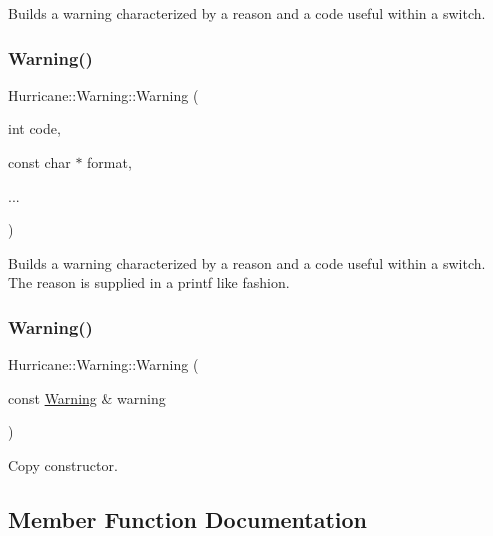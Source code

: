 Builds a warning characterized by a reason and a code useful within a switch. \mbox{\label{classHurricane_1_1Warning_aad9cf84a9c08fb2012462e6f38450bf0}} 
\subsubsection{\texorpdfstring{Warning()}{Warning()}\hspace{0.1cm}{\footnotesize\ttfamily [4/5]}}
{\footnotesize\ttfamily Hurricane\+::\+Warning\+::\+Warning (\begin{DoxyParamCaption}\item[{int}]{code,  }\item[{const char $\ast$}]{format,  }\item[{}]{... }\end{DoxyParamCaption})}

Builds a warning characterized by a reason and a code useful within a switch. The reason is supplied in a {\ttfamily printf} like fashion. \mbox{\label{classHurricane_1_1Warning_a5855a8066401c0b1d1b830a3f7c6216e}} 
\subsubsection{\texorpdfstring{Warning()}{Warning()}\hspace{0.1cm}{\footnotesize\ttfamily [5/5]}}
{\footnotesize\ttfamily Hurricane\+::\+Warning\+::\+Warning (\begin{DoxyParamCaption}\item[{const \mbox{\hyperlink{classHurricane_1_1Warning}{Warning}} \&}]{warning }\end{DoxyParamCaption})}

Copy constructor. 

\subsection{Member Function Documentation}
\mbox{\label{classHurricane_1_1Warning_a21827cacf1cb4f53d8a1963bdeb3cd50}} 
